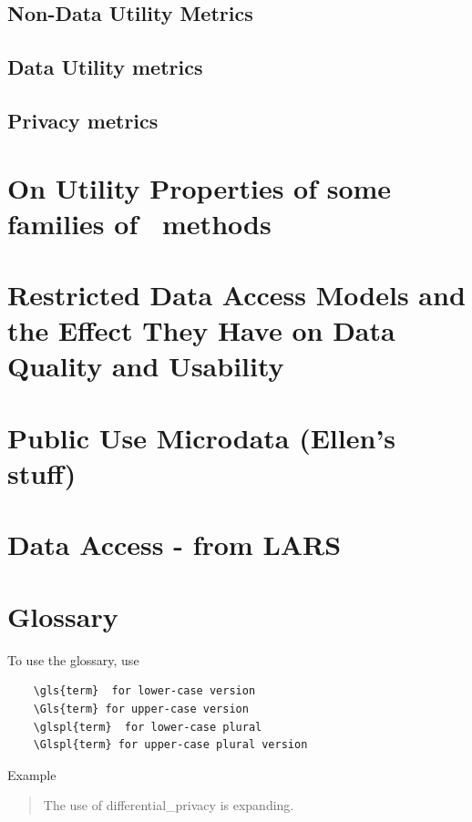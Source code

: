 \documentclass[12pt]{article}
\begin{document}
\subsection{Non-Data Utility Metrics}\label{sec:other_metrics}


\subsection{Data Utility metrics} \label{du_metrics}


\subsection{Privacy metrics}\label{sec:privacy_metrics}



\section{On Utility Properties of some families of \SDL\ methods}
\label{subsec.simulateddata}



 
\section{{Restricted Data Access Models and the Effect They Have on Data Quality and Usability}}


\section{Public Use Microdata (Ellen's stuff)}



\section{Data Access - from LARS}


%
%
%
\printbibliography[]

\section*{Glossary}
To use the glossary, use 
\begin{verbatim}
    \gls{term}  for lower-case version
    \Gls{term} for upper-case version
    \glspl{term}  for lower-case plural
    \Glspl{term} for upper-case plural version
\end{verbatim}
Example
\begin{quote}
    The use of \gls{differential_privacy} is expanding.
\end{quote}

\printglossary
\end{document}
